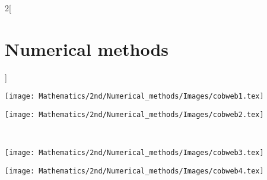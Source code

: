 \documentclass[class=article,10pt,crop=false]{standalone}
\begin{document}
\begin{multicols}{2}[\section{Numerical methods}]
\begin{definition}
\end{definition}
\begin{minipage}{\linewidth}
    \centering
    \begin{minipage}{0.49\linewidth} 
        \centering
        \texttt{[image: Mathematics/2nd/Numerical\_methods/Images/cobweb1.tex]}
    \end{minipage}\hfill
    \begin{minipage}{0.49\linewidth} 
        \centering
        \texttt{[image: Mathematics/2nd/Numerical\_methods/Images/cobweb2.tex]}
    \end{minipage}\\
    \begin{minipage}{0.49\linewidth} 
        \centering
        \texttt{[image: Mathematics/2nd/Numerical\_methods/Images/cobweb3.tex]}
    \end{minipage}\hfill
    \begin{minipage}{0.49\linewidth} 
        \centering
        \texttt{[image: Mathematics/2nd/Numerical\_methods/Images/cobweb4.tex]}
    \end{minipage}
\end{minipage}

\end{multicols}
\end{document}
